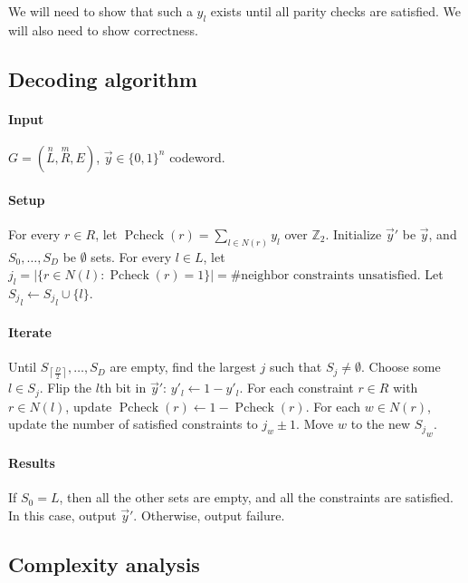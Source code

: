 \documentclass{idc_msc}
\DeclareMathOperator*{\Pcheck}{Pcheck}
\begin{document}
We will need to show that such a \(y_l\) exists until all parity checks are satisfied.
We will also need to show correctness.

\subsection{Decoding algorithm}

\paragraph{Input}

\(G = (\overset{n}{L}, \overset{m}{R}, E)\), \(\vec{y} \in \{0,1\}^n\) codeword.

\paragraph{Setup}

For every \(r \in R\), let \(\Pcheck(r) = \sum_{l \in N(r)} y_l\) over \(\mathbb{Z}_2\).
Initialize \(\vec{y}'\) be \(\vec{y}\), and \(S_0, \ldots, S_D\) be \(\emptyset\) sets.
For every \(l \in L\), let \(j_l = |\{r \in N(l) : \Pcheck(r) = 1\}| = \text{\# neighbor constraints unsatisfied}\).
Let \({S_j}_l \gets {S_j}_l \cup \{l\} \).

\paragraph{Iterate}

Until \(S_{\left\lceil \frac{D}{2} \right\rceil}, \ldots, S_D\) are empty, find the largest \(j\) such that \(S_j \ne \emptyset\).
Choose some \(l \in S_j\).
Flip the \(l\)th bit in \(\vec{y}'\): \(y'_l \gets 1 - y'_l\).
For each constraint \(r \in R\) with \(r \in N(l)\), update \(\Pcheck(r) \gets 1 - \Pcheck(r)\).
For each \(w \in N(r)\), update the number of satisfied constraints to \(j_w \pm 1\).
Move \(w\) to the new \({S_j}_w\).

\paragraph{Results}

If \(S_0 = L\), then all the other sets are empty, and all the constraints are satisfied.
In this case, output \(\vec{y}'\).
Otherwise, output failure.

\subsection{Complexity analysis}
\end{document}
